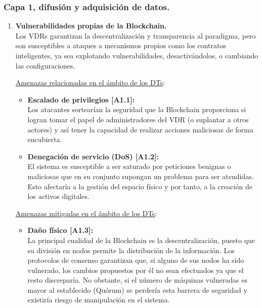 \documentclass[../main.tex]{subfiles}
\begin{document}
\subsubsection{Capa 1, difusión y adquisición de datos.}
\begin{enumerate}[label=\textbf{R1.\arabic*}, leftmargin=48pt]
    \item \textbf{Vulnerabilidades propias de la Blockchain.}\label{R1.1}
    \\ Los \acrshort{VDR}s garantizan la descentralización y transparencia al paradigma, pero son susceptibles a ataques a mecanismos propios como los \Gls{contratos inteligentes}, ya sea explotando vulnerabilidades, desactivándolos, o cambiando las configuraciones.

    \underline{Amenazas relacionadas en el ámbito de los \acrshort{DT}s}:
    \begin{itemize}
        \item \textbf{Escalado de privilegios [A1.1]:}\label{A1.1}
        \\ Los atacantes sortearían la seguridad que la Blockchain proporciona si logran tomar el papel de administradores del \acrshort{VDR} (o suplantar a otros actores) y así tener la capacidad de realizar acciones maliciosas de forma encubierta.
        \item \textbf{Denegación de servicio (DoS) [A1.2]:}\label{A1.2}
        \\ El sistema es susceptible a ser saturado por peticiones benignas o maliciosas que en su conjunto supongan un problema para ser atendidas. Esto afectaría a la gestión del espacio físico y por tanto, a la creación de los activos digitales.
    \end{itemize}
    
    \underline{Amenazas mitigadas en el ámbito de los \acrshort{DT}s}: 
    \begin{itemize}        
        \item \textbf{Daño físico [A1.3]:}\label{A1.3} 
        \\ La principal cualidad de la Blockchain es la descentralización, puesto que su división en nodos permite la distribución de la información. Los protocolos de consenso garantizan que, si alguno de sus nodos ha sido vulnerado, los cambios propuestos por él no sean efectuados ya que el resto discreparía. No obstante, si el número de máquinas vulneradas es mayor al establecido (Quórum) se perdería esta barrera de seguridad y existiría riesgo de manipulación en el sistema.
    \end{itemize}


\end{enumerate}
\end{document}
